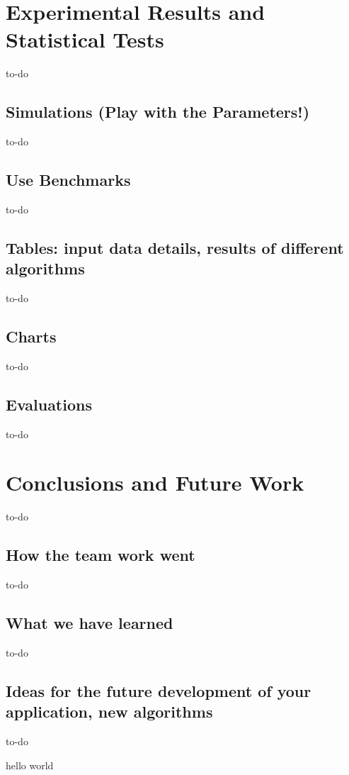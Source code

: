 \documentclass[a4paper,12pt]{article}
\begin{document}
\section{Experimental Results and Statistical Tests}
to-do
\subsection{Simulations (Play with the Parameters!)}
to-do
\subsection{Use Benchmarks}
to-do
\subsection{Tables: input data details, results of different algorithms}
to-do
\subsection{Charts}
to-do
\subsection{Evaluations}
to-do

\section{Conclusions and Future Work}
to-do
\subsection{How the team work went}
to-do
\subsection{What we have learned}
to-do
\subsection{Ideas for the future development of your application, new algorithms}
to-do

hello world
\end{document}
